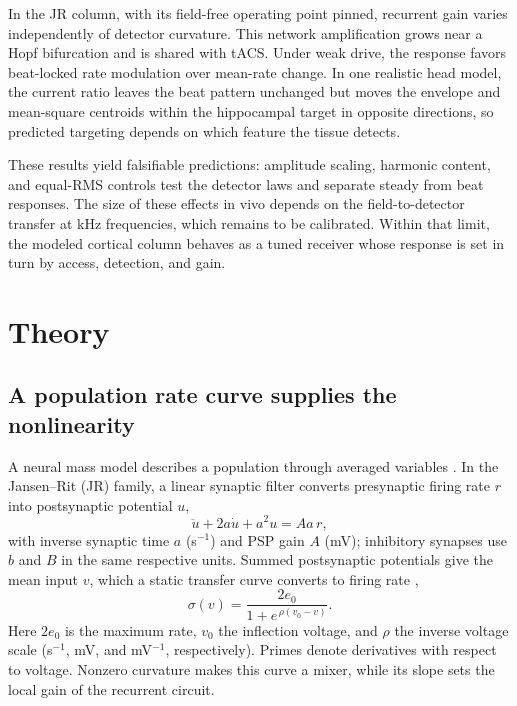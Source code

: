 \documentclass[a4paper]{article}
\newcommand{\Sig}{\sigma}
\begin{document}
In the JR column, with its field-free operating point pinned, recurrent gain varies
independently of detector curvature. This network amplification grows near a Hopf
bifurcation and is shared with tACS. Under weak drive, the response
favors beat-locked rate modulation over mean-rate change. In one realistic head model, the current ratio leaves the beat pattern unchanged
but moves the envelope and mean-square centroids within the hippocampal target in
opposite directions, so predicted targeting depends on which feature the tissue detects.

 These results yield falsifiable
predictions: amplitude scaling, harmonic content, and equal-RMS controls test the
detector laws and separate steady from beat responses. The size of these effects in vivo depends on the
field-to-detector transfer at kHz frequencies, which remains to be calibrated. Within
that limit, the modeled cortical column behaves as a tuned receiver whose response is set in
turn by access, detection, and gain.



\section{Theory}

\subsection{A population rate curve supplies the nonlinearity}\label{sec:nmm}
A neural mass model describes a population through averaged variables
\cite{ruffini2025rosetta,jansen1995}. In the Jansen--Rit (JR) family, a linear synaptic
filter converts presynaptic firing rate $r$ into postsynaptic potential $u$,
\[
\ddot u+2a\dot u+a^2u=Aa\,r,
\]
with inverse synaptic time $a$ (s$^{-1}$) and PSP gain $A$ (mV); inhibitory synapses use
$b$ and $B$ in the same respective units. Summed postsynaptic potentials give the mean input $v$, which
a static transfer curve converts to firing rate \cite{wilsoncowan1972},
\begin{equation}
\Sig(v)=\frac{2e_0}{1+e^{\,\rho(v_0-v)}} .
\label{eq:sigmoid}
\end{equation}
Here $2e_0$ is the maximum rate, $v_0$ the inflection voltage, and $\rho$ the inverse
voltage scale (s$^{-1}$, mV, and mV$^{-1}$, respectively). Primes denote
derivatives with respect to voltage. Nonzero curvature makes this curve a mixer, while its slope sets
the local gain of the recurrent circuit.
\end{document}
